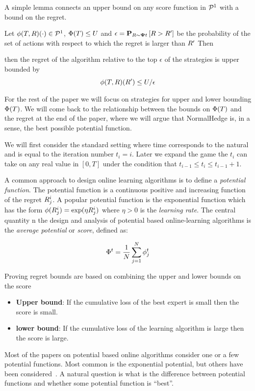 \documentclass{article}[12pt]
\begin{document}
A simple lemma connects an upper bound on any score function in ${\cal P}^{1}$ with a bound on the regret.
\begin{lemma}
Let $\phi(T,R)(\cdot) \in {\cal P}^{1}$, $\Phi(T) \leq U$ and $\epsilon={\bf P}_{R \sim
  {\bf \Psi}{t}}\left[ R >R' \right]$ be the probability of the set of actions with
respect to which the regret is larger than $R'$ Then

then the regret of the algorithm relative 
to the top $\epsilon$ of the strategies is upper bounded by
\[
  \phi(T,R)(R') \leq U/\epsilon
\]
\end{lemma}

For the rest of the paper we will focus on strategies for upper and lower bounding $\Phi(T)$. We will come back to the relationship between the bounds on $\Phi(T)$ and the regret at the end of the paper, where we will argue that NormalHedge is, in a sense, the best possible potential function.

We will first consider the standard setting where time corresponds to
the natural and is equal to the iteration number $t_i=i$. Later we
expand the game the $t_i$ can take on any real value in $[0,T]$ under
the condition that $t_{i-1} \leq t_i \leq t_{i-1}+1$.

A common approach to design online learning algorithms is to define a
{\em potential function}.  The potential function is a continuous
positive and increasing function of the regret $R_j^i$. A popular
potential function is the exponential function which has the form
$\phi(R_j^i) = \exp(\eta R_j^i)$ where $\eta>0$ is the {\em learning rate}. The central
quantity n the design and analysis of potential based online-learning algorithms is
the {\em average potential} or {\em score}, defined as:

$$\Phi^t = \frac{1}{N} \sum_{j=1}^N \phi_j^t$$

Proving regret bounds are based on combining the upper and lower
bounds on the score
\begin{itemize}
\item {\bf Upper bound}: If the cumulative loss of the best expert is
  small then the score is small.
\item {\bf lower bound}: If the cumulative loss of the learning algorithm is large
then the score is large.
\end{itemize}

Most of the papers on potential based online algorithms consider
one or a few potential functions. Most common is the exponential
potential, but others have been considered~\cite{cesa2006prediction}.
A natural question is what is the difference between potential
functions and whether some potential function is ``best''.
\end{document}
